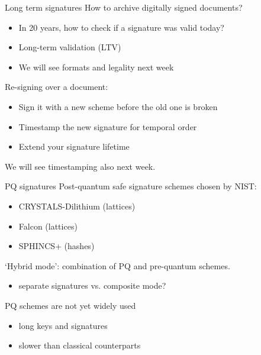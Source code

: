 \begin{frame}{Long term signatures}
  How to archive digitally signed documents?
  \begin{itemize}[<+(1)->]
    \item In 20 years, how to check if a signature was valid today?
    \item Long-term validation (LTV)
    \item We will see formats and legality next week
  \end{itemize}

  \pause
  Re-signing over a document:
  \begin{itemize}[<+(1)->]
    \item Sign it with a new scheme before the old one is broken
    \item Timestamp the new signature for temporal order
    \item Extend your signature lifetime
  \end{itemize}

  \pause
  We will see timestamping also next week.
\end{frame}

\begin{frame}{PQ signatures}
  Post-quantum safe signature schemes chosen by NIST:
  \begin{itemize}[<+(1)->]
    \item CRYSTALS-Dilithium (lattices)
    \item Falcon (lattices)
    \item SPHINCS+ (hashes)
  \end{itemize}

  \vspace*{0.5em}

  \pause
  `Hybrid mode': combination of PQ and pre-quantum schemes.
  \begin{itemize}[<+(1)->]
    \item separate signatures vs. composite mode?
  \end{itemize}

  \vspace*{0.5em}

  \pause
  PQ schemes are not yet widely used
  \begin{itemize}
    \item long keys and signatures
    \item slower than classical counterparts
  \end{itemize}
\end{frame}


